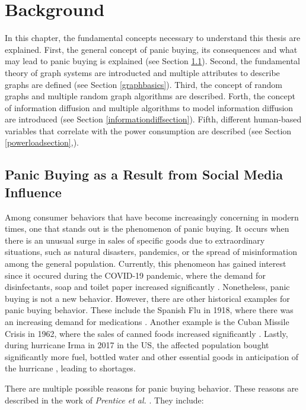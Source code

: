 \chapter{Background}
\label{background}

In this chapter, the fundamental concepts necessary to understand 
this thesis are explained.
First, the general concept of panic buying,
its consequences and what may lead to panic buying is explained 
(see Section \ref{panicbuying}).
Second, the fundamental theory of graph systems are 
introducted and multiple attributes to describe graphs are defined 
(see Section \ref{graphbasics}).
Third, the concept of random graphs and multiple random 
graph algorithms are described.
Forth, the concept of information diffusion
and multiple algorithms to model information diffusion are introduced
(see Section \ref{informationdiffsection}).
Fifth, different human-based variables that 
correlate with the power consumption are described
(see Section \ref{powerloadsection},).


\section{Panic Buying as a Result from Social Media Influence}
\label{panicbuying}

Among consumer behaviors that have become increasingly concerning in modern times, 
one that stands out is the phenomenon of panic buying.
It occurs when there is an unusual surge in sales of 
specific goods due to extraordinary situations, such as natural disasters, 
pandemics, or the spread of misinformation among the general population.
Currently, this phenomeon has gained interest since it occured
during the COVID-19 pandemic,
where the demand for disinfectants, soap and toilet paper increased significantly
\cite{covidpanicbuying}. Nonetheless, panic buying is not a new behavior.
However, there are other historical examples for panic buying behavior.
These include the Spanish Flu
in 1918, where there was an increasing demand for medications 
\cite{honigsbaum2013regulating}. Another example is the Cuban Missile Crisis 
in 1962, where the sales of canned foods increased significantly 
\cite{george2004awaiting}. 
Lastly, during hurricane Irma in 2017 in the US, the affected population bought
significantly more fuel, bottled water 
and other essential goods in anticipation of the hurricane \cite{irmahurricane},
leading to shortages.

There are multiple possible reasons for panic buying behavior. These reasons 
are described in the work of \textit{Prentice et al.}
\cite{prentice2022antecedents}. They include:

